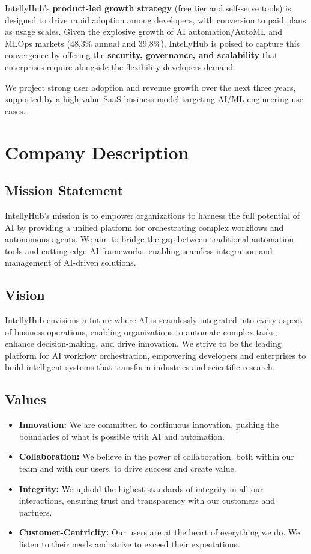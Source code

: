 \documentclass[11pt, a4paper, oneside]{article}
\begin{document}
IntellyHub's \textbf{product-led growth strategy} (free tier and self-serve tools) is designed to drive rapid adoption among developers, with conversion to paid plans as usage scales. Given the explosive growth of AI automation/AutoML and MLOps markets (48,3\% annual\cite{AIMarket} and 39,8\%\cite{MLOpsMarket}), IntellyHub is poised to capture this convergence by offering the \textbf{security, governance, and scalability} that enterprises require alongside the flexibility developers demand.

We project strong user adoption and revenue growth over the next three years, supported by a high-value SaaS business model targeting AI/ML engineering use cases.

\section{Company Description}
\subsection{Mission Statement}
IntellyHub's mission is to empower organizations to harness the full potential of AI by providing a unified platform for orchestrating complex workflows and autonomous agents. We aim to bridge the gap between traditional automation tools and cutting-edge AI frameworks, enabling seamless integration and management of AI-driven solutions.

\subsection{Vision}
IntellyHub envisions a future where AI is seamlessly integrated into every aspect of business operations, enabling organizations to automate complex tasks, enhance decision-making, and drive innovation. We strive to be the leading platform for AI workflow orchestration, empowering developers and enterprises to build intelligent systems that transform industries and scientific research.

\subsection{Values}
\begin{itemize}
    \item \textbf{Innovation:} We are committed to continuous innovation, pushing the boundaries of what is possible with AI and automation.
    \item \textbf{Collaboration:} We believe in the power of collaboration, both within our team and with our users, to drive success and create value.
    \item \textbf{Integrity:} We uphold the highest standards of integrity in all our interactions, ensuring trust and transparency with our customers and partners.
    \item \textbf{Customer-Centricity:} Our users are at the heart of everything we do. We listen to their needs and strive to exceed their expectations.
\end{itemize}
\end{document}

